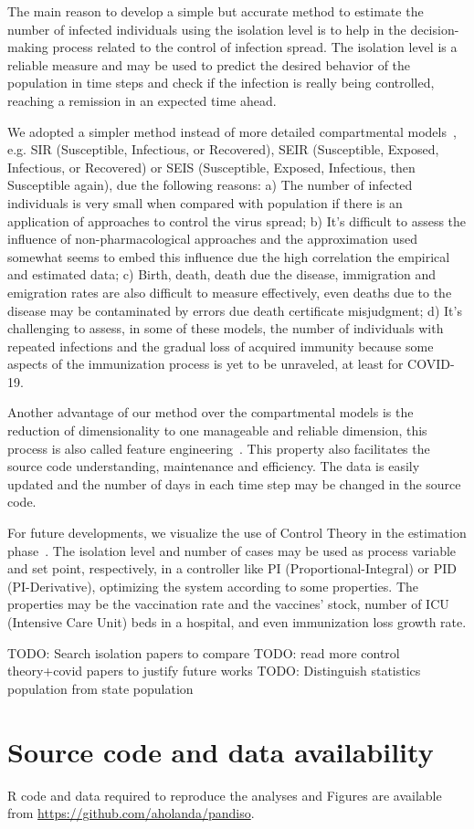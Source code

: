 \documentclass[review]{elsarticle}
\def\covid{\hbox{COVID-19}} %
\begin{document}
The main reason to develop a simple but accurate method to estimate 
the number of infected individuals using the isolation level is to help 
in the decision-making process related to the control of infection spread. 
The isolation level is a reliable measure and may be used to predict 
the desired behavior of the population in time steps and check if the infection 
is really being controlled, reaching a remission in an expected time ahead.

We adopted a simpler method instead of more detailed 
compartmental models~\cite{Ross1916,Ross1917a,Ross1917b}, 
e.g. SIR (Susceptible, Infectious, or Recovered), SEIR (Susceptible, Exposed, Infectious, or Recovered) 
or SEIS (Susceptible, Exposed, Infectious, then Susceptible again), due the following reasons: 
a) The number of infected individuals is very small when compared with population if there is 
    an application of approaches to control the virus spread; 
b) It's difficult to assess the influence of non-pharmacological approaches and the approximation 
    used somewhat seems to embed this influence due the high correlation 
   the empirical and estimated data; 
c) Birth, death, death due the disease, immigration and emigration rates 
   are also difficult to measure effectively, even deaths due to the disease 
   may be contaminated by errors due death certificate misjudgment; 
d) It's challenging to assess, in some of these models, the number of 
    individuals with repeated infections and the gradual loss of acquired 
    immunity because some aspects of the immunization process is 
   yet to be unraveled, at least for \covid.

Another advantage of our method over the compartmental models is the 
 reduction of dimensionality to one manageable and reliable dimension, 
this process is also called feature engineering~\cite{Spieg2019}. 
This property also facilitates the source code 
understanding, maintenance and efficiency. 
The data is easily updated and the number of days in each time step 
may be changed in the source code.

For future developments, we visualize the use of Control Theory 
in the estimation phase~\cite{Stewart2020}. 
The isolation level and number of cases 
may be used as process variable and set point, respectively, 
in a controller like PI (Proportional-Integral) or PID (PI-Derivative), 
optimizing the system according to some properties. 
The properties may be the vaccination rate and the vaccines’ stock, 
number of ICU (Intensive Care Unit) beds in a hospital, 
and even immunization loss growth rate.

TODO: Search isolation papers to compare
TODO: read more control theory+covid papers to justify future works
TODO: Distinguish statistics population from state population

\section{Source code and data availability}
R code and data required to reproduce the analyses 
and Figures are available from
\url{https://github.com/aholanda/pandiso}.


\end{document}
